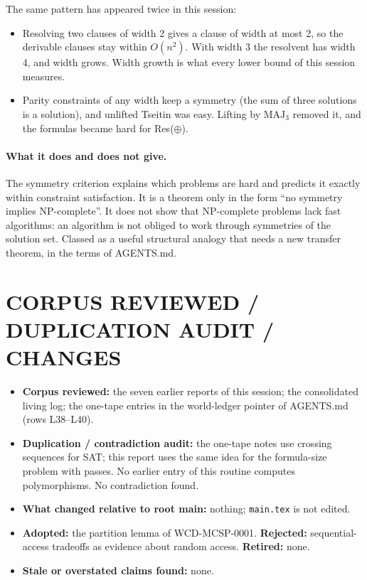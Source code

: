 \documentclass[11pt]{article}
\begin{document}
The same pattern has appeared twice in this session:
\begin{itemize}
\item Resolving two clauses of width 2 gives a clause of width at most 2, so the derivable clauses stay within $O(n^{2})$. With width 3 the resolvent has width 4, and width grows. Width growth is what every lower bound of this session measures.
\item Parity constraints of any width keep a symmetry (the sum of three solutions is a solution), and unlifted Tseitin was easy. Lifting by $\mathrm{MAJ}_3$ removed it, and the formulas became hard for Res($\oplus$).
\end{itemize}

\paragraph{What it does and does not give.} The symmetry criterion explains which problems are hard and predicts it exactly within constraint satisfaction. It is a theorem only in the form ``no symmetry implies NP-complete''. It does not show that NP-complete problems lack fast algorithms: an algorithm is not obliged to work through symmetries of the solution set. Classed as a useful structural analogy that needs a new transfer theorem, in the terms of AGENTS.md.

\section{CORPUS REVIEWED / DUPLICATION AUDIT / CHANGES}
\begin{itemize}
\item \textbf{Corpus reviewed:} the seven earlier reports of this session; the consolidated living log; the one-tape entries in the world-ledger pointer of AGENTS.md (rows L38--L40).
\item \textbf{Duplication / contradiction audit:} the one-tape notes use crossing sequences for SAT; this report uses the same idea for the formula-size problem with passes. No earlier entry of this routine computes polymorphisms. No contradiction found.
\item \textbf{What changed relative to root main:} nothing; \texttt{main.tex} is not edited.
\item \textbf{Adopted:} the partition lemma of WCD-MCSP-0001. \textbf{Rejected:} sequential-access tradeoffs as evidence about random access. \textbf{Retired:} none.
\item \textbf{Stale or overstated claims found:} none.
\end{itemize}
\end{document}
